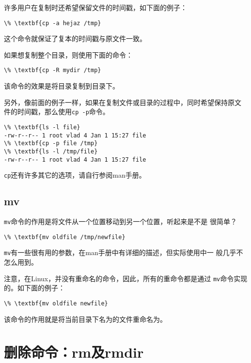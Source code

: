许多用户在复制时还希望保留文件的时间戳，如下面的例子：
\begin{Verbatim}[frame=single, commandchars=\\\{\}]
\% \textbf{cp -a hejaz /tmp}
\end{Verbatim}
这个命令就保证了复本的时间戳与原文件一致。

如果想复制整个目录，则使用下面的命令：
\begin{Verbatim}[frame=single, commandchars=\\\{\}]
\% \textbf{cp -R mydir /tmp}
\end{Verbatim}
该命令的效果是将目录复制到目录下。

另外，像前面的例子一样，如果在复制文件或目录的过程中，同时希望保持原文
件的时间戳，那么使用\texttt{cp -p}命令。
\begin{Verbatim}[frame=single, commandchars=\\\{\}]
\% \textbf{ls -l file}
-rw-r--r-- 1 root vlad 4 Jan 1 15:27 file
\% \textbf{cp -p file /tmp}
\% \textbf{ls -l /tmp/file}
-rw-r--r-- 1 root vlad 4 Jan 1 15:27 file
\end{Verbatim}

\texttt{cp}还有许多其它的选项，请自行参阅man手册。

\subsection{mv}
\label{sec:handlingFilesAndDirectories:copyAndMove:mv}
\texttt{mv}命令的作用是将文件从一个位置移动到另一个位置，听起来是不是
很简单？
\begin{Verbatim}[frame=single, commandchars=\\\{\}]
\% \textbf{mv oldfile /tmp/newfile}
\end{Verbatim}

\texttt{mv}有一些很有用的参数，在man手册中有详细的描述，但实际使用中一
般几乎不怎么用到。

注意，在Linux，并没有重命名的命令，因此，所有的重命令都是通过
\texttt{mv}命令实现的。如下面的例子：
\begin{Verbatim}[frame=single, commandchars=\\\{\}]
\% \textbf{mv oldfile newfile}
\end{Verbatim}
该命令的作用就是将当前目录下名为的文件重命名为。

\section{删除命令：rm及rmdir}
\label{sec:handlingFilesAndDirectories:deletion}

